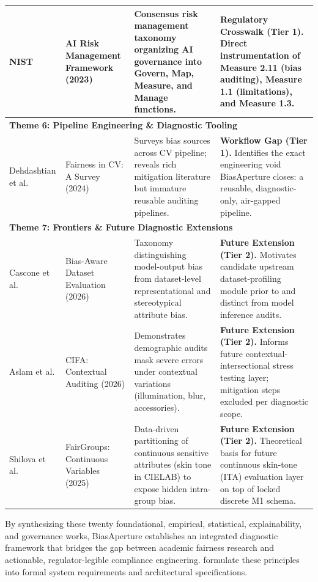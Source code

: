 \begin{center}
\begin{longtable}{|p{2.2cm}|p{2.6cm}|p{4.4cm}|p{4.4cm}|}
NIST \cite{nist2023aiframework} &
AI Risk Management Framework (2023) &
Consensus risk management taxonomy organizing AI governance into Govern, Map, Measure, and Manage functions. &
\textbf{Regulatory Crosswalk (Tier 1).} Direct instrumentation of Measure 2.11 (bias auditing), Measure 1.1 (limitations), and Measure 1.3. \\
\hline

\multicolumn{4}{|l|}{\textbf{Theme 6: Pipeline Engineering \& Diagnostic Tooling}} \\
\hline
Dehdashtian et al. \cite{dehdashtian2024survey} &
Fairness in CV: A Survey (2024) &
Surveys bias sources across CV pipeline; reveals rich mitigation literature but immature reusable auditing pipelines. &
\textbf{Workflow Gap (Tier 1).} Identifies the exact engineering void BiasAperture closes: a reusable, diagnostic-only, air-gapped pipeline. \\
\hline

\multicolumn{4}{|l|}{\textbf{Theme 7: Frontiers \& Future Diagnostic Extensions}} \\
\hline
Cascone et al. \cite{cascone2026framework} &
Bias-Aware Dataset Evaluation (2026) &
Taxonomy distinguishing model-output bias from dataset-level representational and stereotypical attribute bias. &
\textbf{Future Extension (Tier 2).} Motivates candidate upstream dataset-profiling module prior to and distinct from model inference audits. \\
\hline

Aslam et al. \cite{aslam2026cifa} &
CIFA: Contextual Auditing (2026) &
Demonstrates demographic audits mask severe errors under contextual variations (illumination, blur, accessories). &
\textbf{Future Extension (Tier 2).} Informs future contextual-intersectional stress testing layer; mitigation steps excluded per diagnostic scope. \\
\hline

Shilova et al. \cite{shilova2025fairgroups} &
FairGroups: Continuous Variables (2025) &
Data-driven partitioning of continuous sensitive attributes (skin tone in CIELAB) to expose hidden intra-group bias. &
\textbf{Future Extension (Tier 2).} Theoretical basis for future continuous skin-tone (ITA) evaluation layer on top of locked discrete M1 schema. \\
\hline

\end{longtable}
\end{center}

By synthesizing these twenty foundational, empirical, statistical, explainability, and governance works, BiasAperture establishes an integrated diagnostic framework that bridges the gap between academic fairness research and actionable, regulator-legible compliance engineering.  formulate these principles into formal system requirements and architectural specifications.
